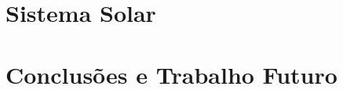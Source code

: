 \documentclass[a4paper]{article}
\begin{document}
\section{Sistema Solar}



\section{Conclusões e Trabalho Futuro}

\end{document}
